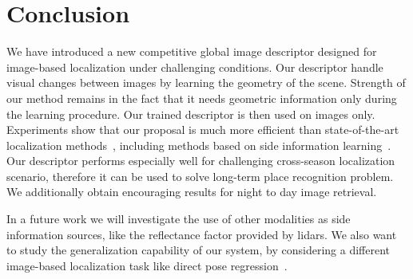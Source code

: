 \section{Conclusion}
\label{sec:conclusion}

We have introduced a new competitive global image descriptor designed for image-based localization under challenging conditions. Our descriptor handle visual changes between images by learning the geometry of the scene. Strength of our method remains in the fact that it needs geometric information only during the learning procedure. Our trained descriptor is then used on images only. Experiments show that our proposal is much more efficient than state-of-the-art localization methods~\cite{Arandjelovic2017, Radenovic2017}, including methods based on side information learning~\cite{Hoffman2016}. Our descriptor performs especially well for challenging cross-season localization scenario, therefore it can be used to solve long-term place recognition problem. We additionally obtain encouraging results for night to day image retrieval.

In a future work we will investigate the use of other modalities as side information sources, like the reflectance factor provided by lidars. We also want to study the generalization capability of our system, by considering a different image-based localization task like direct pose regression~\cite{Brachmann2018}.
